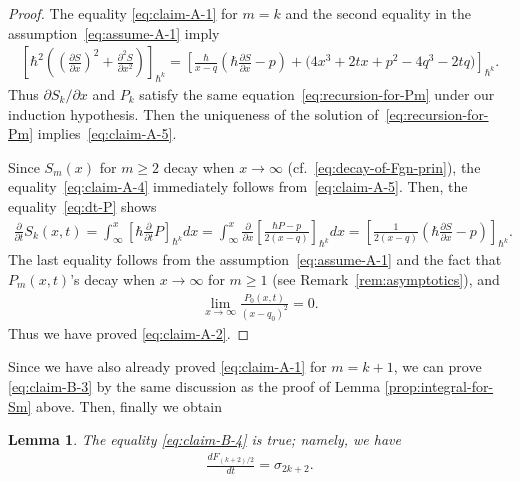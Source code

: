 \documentclass[11pt]{article}
\newtheorem{lem}[thm]{Lemma}
\theoremstyle{definition}
\numberwithin{equation}{section}
\def\p{\partial}
\begin{document}
\begin{proof}
The equality \eqref{eq:claim-A-1} for $m=k$ and
the second equality in the assumption~\eqref{eq:assume-A-1}
imply
\begin{gather*}
\left[
\hbar^{2}\left( \left(\frac{\p S}{\p x}\right)^{2} +
\frac{\p^{2} S}{\p x^{2}} \right)
\right]_{\hbar^{k}}
= \left[ \frac{\hbar}{x-q}\left( \hbar \frac{\p S}{\p x} - p \right)
+ \big(4x^{3}+2t x + p^{2} - 4q^{3}-2tq\big) \right]_{\hbar^{k}}.
\end{gather*}
Thus ${\p S_{k}}/{\p x}$ and $P_{k}$ satisfy the
same equation~\eqref{eq:recursion-for-Pm} under our induction hypothesis.
Then the uniqueness of the solution of~\eqref{eq:recursion-for-Pm}
implies~\eqref{eq:claim-A-5}.

Since $S_{m}(x)$ for $m \ge 2$ decay when
$x \rightarrow \infty$
(cf.~\eqref{eq:decay-of-Fgn-prin}),
the equality~\eqref{eq:claim-A-4}
immediately follows from~\eqref{eq:claim-A-5}.
Then, the equality~\eqref{eq:dt-P} shows
\begin{gather*}
\frac{\p}{\p t} S_{k}(x,t)   =
\int^{x}_{\infty} \left[ \hbar \frac{\p}{\p t} P
\right]_{\hbar^{k}}dx
  =
\int^{x}_{\infty} \frac{\p}{\p x} \left[
\frac{\hbar P - p}{2(x-q)} \right]_{\hbar^{k}} dx
  =
\left[
\frac{1}{2(x-q)} \left( \hbar \frac{\p S}{\p x} - p \right)
\right]_{\hbar^{k}}.
\end{gather*}
The last equality follows from the assumption~\eqref{eq:assume-A-1} and the fact that
$P_{m}(x,t)$'s decay when $x \rightarrow \infty$
for $m \ge 1$ (see Remark~\ref{rem:asymptotics}),
and
\begin{gather*}
\lim_{x\rightarrow\infty} \frac{P_{0}(x,t)}{(x-q_{0})^{2}} = 0.
\end{gather*}
Thus we have proved \eqref{eq:claim-A-2}.
\end{proof}

Since we have also already proved \eqref{eq:claim-A-1}
for $m = k+1$, we can prove \eqref{eq:claim-B-3}
by the same discussion as the proof of
Lemma \ref{prop:integral-for-Sm} above.
Then, f\/inally we obtain

\begin{lem} \label{prop:partial-taufunction-conjecture}
The equality \eqref{eq:claim-B-4} is true; namely, we have
\begin{gather}\label{eq:claim-B-5}
\frac{dF_{(k+2)/2}}{dt} = \sigma_{2k+2}.
\end{gather}
\end{lem}
\end{document}
